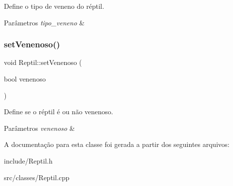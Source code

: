 Define o tipo de veneno do réptil. 


\begin{DoxyParams}{Parâmetros}
{\em tipo\+\_\+veneno} & \\
\hline
\end{DoxyParams}
\mbox{\label{classReptil_a9f7ab2a0e2b30040c7c9df48039a266a}} 
\subsubsection{\texorpdfstring{set\+Venenoso()}{setVenenoso()}}
{\footnotesize\ttfamily void Reptil\+::set\+Venenoso (\begin{DoxyParamCaption}\item[{bool}]{venenoso }\end{DoxyParamCaption})}



Define se o réptil é ou não venenoso. 


\begin{DoxyParams}{Parâmetros}
{\em venenoso} & \\
\hline
\end{DoxyParams}


A documentação para esta classe foi gerada a partir dos seguintes arquivos\+:\begin{DoxyCompactItemize}
\item 
include/Reptil.\+h\item 
src/classes/Reptil.\+cpp\end{DoxyCompactItemize}
